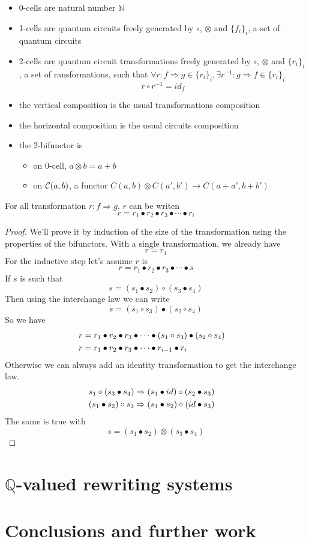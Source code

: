 \documentclass[a4paper]{article}
\begin{document}
\begin{itemize}
\item 0-cells are natural number $\mathbb{N}$
\item 1-cells are quantum circuits freely generated by $\circ$, $\otimes$ and $\{f_i\}_i$, a set of quantum circuits
\item 2-cells are quantum circuit transformations freely generated by $\circ$, $\otimes$ and $\{r_i\}_i$, a set of ransformations, such that $\forall r: f \Rightarrow g \in \{r_i\}_i, \exists r^{-1}: g \Rightarrow f \in \{r_i\}_i$
\[
r \circ r^{-1} = id_f
\]
\item the vertical composition is the usual transformations composition
\item the horizontal composition is the usual circuits composition
\item the 2-bifunctor is
\begin{itemize}
\item on 0-cell, $a \otimes b = a + b$
\item on ${\cal C}(a, b)$, a functor $C(a, b) \otimes C(a', b') \to C(a + a', b + b')$
\end{itemize}
\end{itemize}

\begin{proposition}
For all transformation $r: f \Rightarrow g$, $r$ can be writen
\[
r = r_1 \bullet r_2 \bullet r_3 \bullet \cdots \bullet r_i
\]

\begin{proof}
We'll prove it by induction of the size of the transformation using the properties of the bifunctors.
With a single transformation, we already have
\[
r = r_1
\]
For the inductive step let's assume $r$ is
\[
r = r_1 \bullet r_2 \bullet r_3 \bullet \cdots \bullet s
\]
If $s$ is such that
\[
s = (s_1 \bullet s_2) \circ (s_3 \bullet s_4)
\]
Then using the interchange law we can write
\[
s = (s_1 \circ s_3) \bullet (s_2 \circ s_4)
\]
So we have 
\begin{align}
r &= r_1 \bullet r_2 \bullet r_3 \bullet \cdots \bullet (s_1 \circ s_3) \bullet (s_2 \circ s_4) \cr
r &= r_1 \bullet r_2 \bullet r_3 \bullet \cdots \bullet r_{i - 1} \bullet r_i
\end{align}
Otherwise we can always add an identity transformation to get the interchange law.
\begin{align}
s_1 \circ (s_3 \bullet s_4) &\Rightarrow (s_1 \bullet id) \circ (s_2 \bullet s_3) \cr
(s_1 \bullet s_2) \circ s_3 &\Rightarrow (s_1 \bullet s_2) \circ (id \bullet s_3)
\end{align}
The same is true with
\[
s = (s_1 \bullet s_2) \otimes (s_3 \bullet s_4)
\]
\end{proof}
\end{proposition}


\section{$\mathbb{Q}$-valued rewriting systems}

\section{Conclusions and further work}
\label{sec:conclusion}



\small

\end{document}
